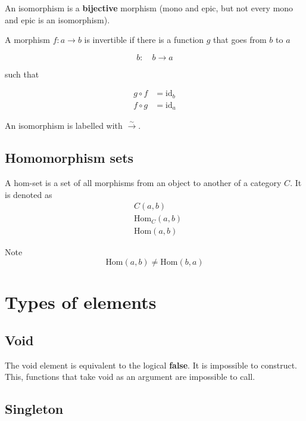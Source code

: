 \documentclass{article}
\begin{document}
An isomorphism is a \textbf{bijective} morphism (mono and epic, but not every mono and epic
is an isomorphism).

A morphism \(f: a \rightarrow b\) is invertible if there
is a function \(g\) that goes from \(b\) to \(a\)

\[
    b:\quad b \rightarrow a
\]

such that

\begin{align*}
    g \circ f &= \text{id}_b
    \\
    f \circ g &= \text{id}_a
\end{align*}

\begin{center}
\end{center}

An isomorphism is labelled with \(\xrightarrow{\sim}\).

\pagebreak

\subsection{Homomorphism sets} %

A hom-set is a set of all morphisms from an object to another
of a category \(C\).
It is denoted as
\begin{align*}
    &C(a, b) \\
    &\text{Hom}_C(a, b) \\
    &\text{Hom}(a, b)
\end{align*}

Note
\[
    \text{Hom}(a, b) \neq \text{Hom}(b, a)
\]

\section{Types of elements}

\subsection{Void}

The void element is equivalent to the logical \textbf{false}.
It is impossible to construct. This, functions that take void
as an argument are impossible to call.

\subsection{Singleton}
\end{document}
